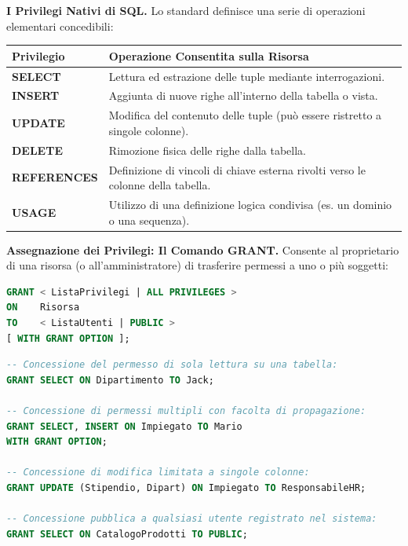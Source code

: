 \documentclass[12pt]{extarticle}
\begin{document}
\medskip
\noindent \textbf{I Privilegi Nativi di SQL.} Lo standard definisce una serie di operazioni elementari concedibili:
\begin{center}
\small
\begin{tabular}{lp{11.5cm}}
    \toprule
    \textbf{Privilegio} & \textbf{Operazione Consentita sulla Risorsa} \\
    \midrule
    \textbf{SELECT} & Lettura ed estrazione delle tuple mediante interrogazioni. \\
    \addlinespace
    \textbf{INSERT} & Aggiunta di nuove righe all'interno della tabella o vista. \\
    \addlinespace
    \textbf{UPDATE} & Modifica del contenuto delle tuple (può essere ristretto a singole colonne). \\
    \addlinespace
    \textbf{DELETE} & Rimozione fisica delle righe dalla tabella. \\
    \addlinespace
    \textbf{REFERENCES} & Definizione di vincoli di chiave esterna rivolti verso le colonne della tabella. \\
    \addlinespace
    \textbf{USAGE} & Utilizzo di una definizione logica condivisa (es. un dominio o una sequenza). \\
    \bottomrule
\end{tabular}
\end{center}

\noindent \textbf{Assegnazione dei Privilegi: Il Comando GRANT.} Consente al proprietario di una risorsa (o all'amministratore) di trasferire permessi a uno o più soggetti:
\begin{lstlisting}[language=SQL]
GRANT < ListaPrivilegi | ALL PRIVILEGES >
ON    Risorsa
TO    < ListaUtenti | PUBLIC >
[ WITH GRANT OPTION ];
\end{lstlisting}

\begin{lstlisting}[language=SQL, caption={Esempi di comando GRANT}]
-- Concessione del permesso di sola lettura su una tabella:
GRANT SELECT ON Dipartimento TO Jack;

-- Concessione di permessi multipli con facolta di propagazione:
GRANT SELECT, INSERT ON Impiegato TO Mario 
WITH GRANT OPTION;

-- Concessione di modifica limitata a singole colonne:
GRANT UPDATE (Stipendio, Dipart) ON Impiegato TO ResponsabileHR;

-- Concessione pubblica a qualsiasi utente registrato nel sistema:
GRANT SELECT ON CatalogoProdotti TO PUBLIC;
\end{lstlisting}
\end{document}
